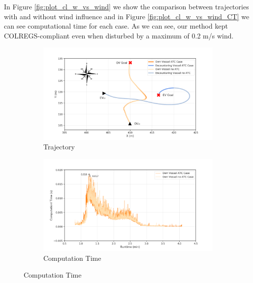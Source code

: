         In Figure \ref{fig:plot_cl_w_vs_wind} we show the comparison between trajectories with and without wind influence and in Figure \ref{fig:plot_cl_w_vs_wind_CT} we can see computational time for each case. As we can see, our method kept COLREGS-compliant even when disturbed by a maximum of 0.2 m/s wind.
        \begin{figure}[H]
        \centering
        
            \begin{subfigure}[b]{0.49\textwidth}
                \centering
                \includegraphics[width=\textwidth]{figs/Chap5/plot_cl_w_vs_wo.png}
                \caption{Trajectory}
                \label{fig:plot_cl_w_vs_wo}
            \end{subfigure}
            \begin{subfigure}[b]{0.49\textwidth}
                \centering
                \includegraphics[width=\textwidth]{figs/Chap5/plot_cl_w_vs_wo_CT.png}
                \caption{Computation Time}
                \label{fig:plot_cl_w_vs_wo_CT}
            \end{subfigure}
            

\end{figure}
